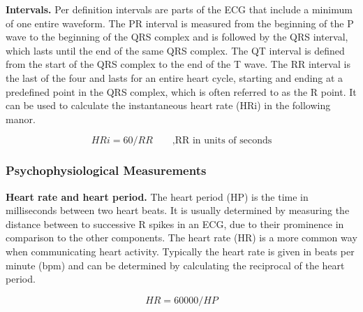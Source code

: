 \textbf{Intervals.} Per definition intervals are parts of the ECG that include a minimum of one entire waveform. The PR interval is measured from the beginning of the P wave to the beginning of the QRS complex and is followed by the QRS interval, which lasts until the end of the same QRS complex. The QT interval is defined from the start of the QRS complex to the end of the T wave. The RR interval is the last of the four and lasts for an entire heart cycle, starting and ending at a predefined point in the QRS complex, which is often referred to as the R point. It can be used to calculate the instantaneous heart rate (HRi) in the following manor.

\begin{equation}
HRi = 60 / RR \qquad \text{,RR in units of seconds}	
\end{equation}

\subsubsection{Psychophysiological Measurements}

\textbf{Heart rate and heart period.} The heart period (HP) is the time in milliseconds between two heart beats. It is usually determined by measuring the distance between to successive R spikes in an ECG, due to their prominence in comparison to the other components. The heart rate (HR) is a more common way when communicating heart activity. Typically the heart rate is given in beats per minute (bpm) and can be determined by calculating the reciprocal of the heart period.

\begin{equation}
HR = 60000 / HP
\end{equation}

